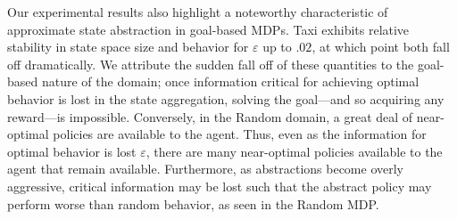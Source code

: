 Our experimental results also highlight a noteworthy characteristic of approximate state abstraction in goal-based \acp{MDP}. Taxi exhibits relative stability in state space size and behavior for $\varepsilon$ up to $.02$, at which point both fall off dramatically. We attribute the sudden fall off of these quantities to the goal-based nature of the domain; once information critical for achieving optimal behavior is lost in the state aggregation, solving the goal---and so acquiring any reward---is impossible. Conversely, in the Random domain, a great deal of near-optimal policies are available to the agent. Thus, even as the information for optimal behavior is lost $\varepsilon$, there are many near-optimal policies available to the agent that remain available. Furthermore, as abstractions become overly aggressive, critical information may be lost such that the abstract policy may perform worse than random behavior, as seen in the Random MDP.


